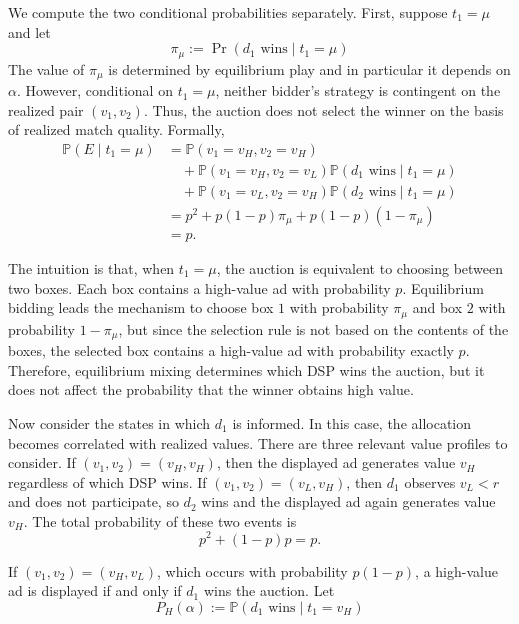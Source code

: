 \documentclass[11pt]{article}
\theoremstyle{plain}
\theoremstyle{definition}
\theoremstyle{plain}
\theoremstyle{plain}
\theoremstyle{plain}
\theoremstyle{plain}
\numberwithin{equation}{section}
\begin{document}
\vspace{0.2cm}

\noindent We compute the two conditional probabilities separately. First, suppose $ t_1 = \mu $ and let
\[
\pi_\mu:=\Pr(d_1\text{ wins}\mid t_1=\mu)
\]
The value of $\pi_\mu$ is determined by equilibrium play and in particular it depends on $ \alpha $. However, conditional on $ t_1 = \mu $, neither bidder's strategy is contingent on the realized pair $ (v_1,v_2) $. Thus, the auction does not select the winner on the basis of realized match quality. Formally,
\begin{align*}
\mathbb{P}(E \mid t_1 = \mu)
&=
\mathbb{P}(v_1=v_H,v_2=v_H) \\
&\quad+
\mathbb{P}(v_1=v_H,v_2=v_L)\mathbb{P}(d_1\text{ wins}\mid t_1=\mu) \\
&\quad+
\mathbb{P}(v_1=v_L,v_2=v_H)\mathbb{P}(d_2\text{ wins}\mid t_1=\mu) \\
&=
p^2+p(1-p)\pi_\mu+p(1-p)(1-\pi_\mu) \\
&=p.
\end{align*}

\vspace{0.2cm}

\noindent The intuition is that, when $ t_1 = \mu $, the auction is equivalent to choosing between two boxes. Each box contains a high-value ad with probability $ p $. Equilibrium bidding leads the mechanism to choose box $ 1 $ with probability $ \pi_\mu $ and box $ 2 $ with probability $ 1 - \pi_\mu $, but since the selection rule is not based on the contents of the boxes, the selected box contains a high-value ad with probability exactly $ p $. Therefore, equilibrium mixing determines which DSP wins the auction, but it does not affect the probability that the winner obtains high value.

Now consider the states in which $ d_1 $ is informed. In this case, the allocation becomes correlated with realized values. There are three relevant value profiles to consider. If $ (v_1,v_2) = (v_H,v_H) $, then the displayed ad generates value $v_H$ regardless of which DSP wins. If $(v_1,v_2)=(v_L,v_H)$, then $d_1$ observes $v_L<r$ and does not participate, so $d_2$ wins and the displayed ad again generates value $v_H$. The total probability of these two events is
\[
p^2+(1-p)p=p.
\]

\vspace{0.2cm}

\noindent If $ (v_1,v_2) = (v_H,v_L) $, which occurs with probability $ p(1-p) $, a high-value ad is displayed if and only if $ d_1 $ wins the auction. Let
\[
P_H(\alpha):=\mathbb{P}(d_1\text{ wins} \mid t_1=v_H)
\]
\end{document}
